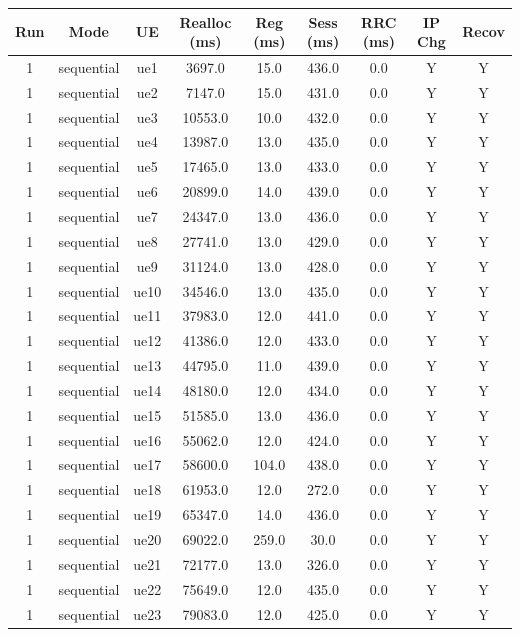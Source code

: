\begin{table}[ht]
\centering
\begin{tabular}{|c|c|c|c|c|c|c|c|c|}
\hline
Run & Mode & UE & Realloc (ms) & Reg (ms) & Sess (ms) & RRC (ms) & IP Chg & Recov \\
\hline
1 & sequential & ue1 & 3697.0 & 15.0 & 436.0 & 0.0 & Y & Y \\
1 & sequential & ue2 & 7147.0 & 15.0 & 431.0 & 0.0 & Y & Y \\
1 & sequential & ue3 & 10553.0 & 10.0 & 432.0 & 0.0 & Y & Y \\
1 & sequential & ue4 & 13987.0 & 13.0 & 435.0 & 0.0 & Y & Y \\
1 & sequential & ue5 & 17465.0 & 13.0 & 433.0 & 0.0 & Y & Y \\
1 & sequential & ue6 & 20899.0 & 14.0 & 439.0 & 0.0 & Y & Y \\
1 & sequential & ue7 & 24347.0 & 13.0 & 436.0 & 0.0 & Y & Y \\
1 & sequential & ue8 & 27741.0 & 13.0 & 429.0 & 0.0 & Y & Y \\
1 & sequential & ue9 & 31124.0 & 13.0 & 428.0 & 0.0 & Y & Y \\
1 & sequential & ue10 & 34546.0 & 13.0 & 435.0 & 0.0 & Y & Y \\
1 & sequential & ue11 & 37983.0 & 12.0 & 441.0 & 0.0 & Y & Y \\
1 & sequential & ue12 & 41386.0 & 12.0 & 433.0 & 0.0 & Y & Y \\
1 & sequential & ue13 & 44795.0 & 11.0 & 439.0 & 0.0 & Y & Y \\
1 & sequential & ue14 & 48180.0 & 12.0 & 434.0 & 0.0 & Y & Y \\
1 & sequential & ue15 & 51585.0 & 13.0 & 436.0 & 0.0 & Y & Y \\
1 & sequential & ue16 & 55062.0 & 12.0 & 424.0 & 0.0 & Y & Y \\
1 & sequential & ue17 & 58600.0 & 104.0 & 438.0 & 0.0 & Y & Y \\
1 & sequential & ue18 & 61953.0 & 12.0 & 272.0 & 0.0 & Y & Y \\
1 & sequential & ue19 & 65347.0 & 14.0 & 436.0 & 0.0 & Y & Y \\
1 & sequential & ue20 & 69022.0 & 259.0 & 30.0 & 0.0 & Y & Y \\
1 & sequential & ue21 & 72177.0 & 13.0 & 326.0 & 0.0 & Y & Y \\
1 & sequential & ue22 & 75649.0 & 12.0 & 435.0 & 0.0 & Y & Y \\
1 & sequential & ue23 & 79083.0 & 12.0 & 425.0 & 0.0 & Y & Y \\

\end{tabular}
\end{table}
